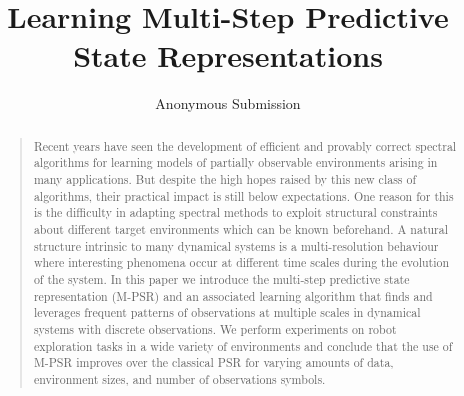 \documentclass[letterpaper]{article}
\begin{document}
\title{Learning Multi-Step Predictive State Representations}
\author{Anonymous Submission}
\maketitle

\begin{abstract}
\begin{quote}
Recent years have seen the development of efficient and provably correct spectral algorithms for learning models of partially observable environments arising in many applications. But despite the high hopes raised by this new class of algorithms, their practical impact is still below expectations. One reason for this is the difficulty in adapting spectral methods to exploit structural constraints about different target environments which can be known beforehand. A natural structure intrinsic to many dynamical systems is a multi-resolution behaviour where interesting phenomena occur at different time scales during the evolution of the system. In this paper we introduce the multi-step predictive state representation (M-PSR) and an associated learning algorithm that finds and leverages frequent patterns of observations at multiple scales in dynamical systems with discrete observations. We perform experiments on robot exploration tasks in a wide variety of environments and conclude that the use of M-PSR improves over the classical PSR for varying amounts of data, environment sizes, and number of observations symbols.

\end{quote}
\end{abstract}





%


%



\end{document}
